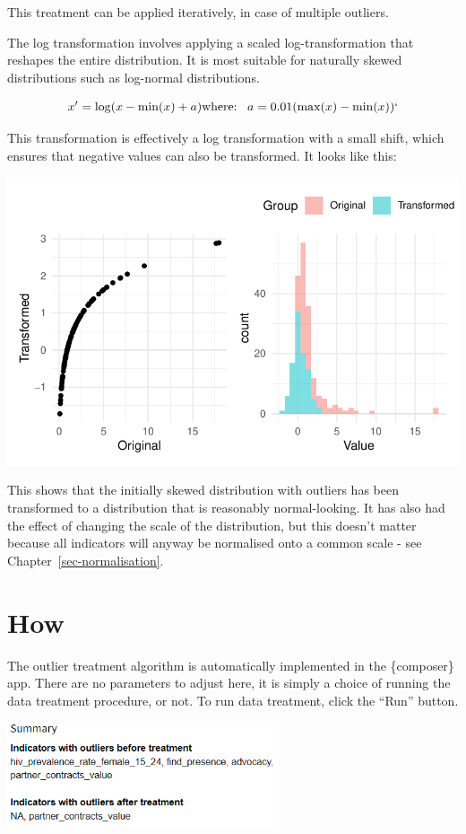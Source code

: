 \documentclass[
  letterpaper,
  DIV=11,
  numbers=noendperiod]{scrreprt}
\begin{document}
This treatment can be applied iteratively, in case of multiple outliers.

The log transformation involves applying a scaled log-transformation
that reshapes the entire distribution. It is most suitable for naturally
skewed distributions such as log-normal distributions.

\[
x' = \log(x-\min(x) + a)\\ 
\text{where:} \;\;\;  a = 0.01(\max(x)-\min(x))`
\]

This transformation is effectively a log transformation with a small
shift, which ensures that negative values can also be transformed. It
looks like this:

\includegraphics{outliers_files/figure-pdf/unnamed-chunk-3-1.pdf}

This shows that the initially skewed distribution with outliers has been
transformed to a distribution that is reasonably normal-looking. It has
also had the effect of changing the scale of the distribution, but this
doesn't matter because all indicators will anyway be normalised onto a
common scale - see Chapter~\ref{sec-normalisation}.

\hypertarget{how-2}{%
\section{How}\label{how-2}}

The outlier treatment algorithm is automatically implemented in the
\{composer\} app. There are no parameters to adjust here, it is simply a
choice of running the data treatment procedure, or not. To run data
treatment, click the ``Run'' button.

\includegraphics[width=0.6\textwidth,height=\textheight]{figs/treat_1.png}
\end{document}
